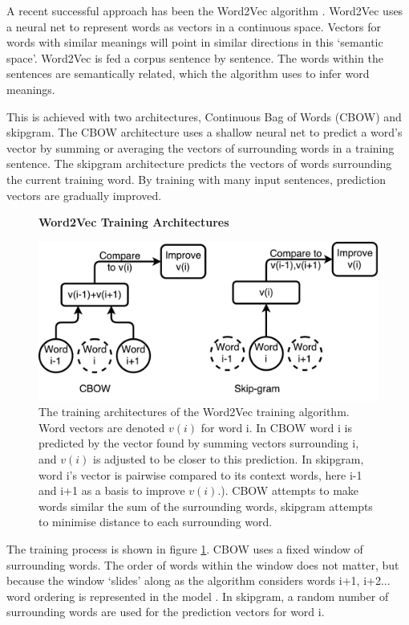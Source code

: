  A recent successful approach has been the Word2Vec algorithm \cite{word2vec1} \cite{word2vec2}.  Word2Vec uses a neural net to represent words as vectors in a continuous space. Vectors for words with similar meanings will point in similar directions in this `semantic space'. Word2Vec is fed a corpus sentence by sentence. The words within the sentences are semantically related, which the algorithm uses to infer word meanings. 
 
This is achieved with two architectures, Continuous Bag of Words (CBOW) and skipgram. The CBOW architecture uses a shallow neural net to predict a word's vector by summing or averaging the vectors of surrounding words in a training sentence. The skipgram architecture predicts the vectors of words surrounding the current training word. By training with many input sentences, prediction vectors are gradually improved. 

\begin{figure}[H]
    \centering
    \textbf{Word2Vec Training Architectures}\par\medskip
    \includegraphics[width=\textwidth]{Natural_Language_Processing/cbow_v_skip.pdf}
    \caption[Word2Vec Training Architectures ]{The training architectures of the Word2Vec training algorithm. Word vectors are denoted $v(i)$ for word i. In CBOW word i is predicted by the vector found by summing vectors surrounding i, and $v(i)$ is adjusted to be closer to this prediction. In skipgram, word i's vector is pairwise compared to its context words, here i-1 and i+1 as a basis to improve $v(i)$.). CBOW attempts to make words similar the sum of the surrounding words, skipgram attempts to minimise distance to each surrounding word.}
     \label{fig:CBOWSKIP}
\end{figure}

The training process is shown in figure \ref{fig:CBOWSKIP}. CBOW uses a fixed window of surrounding words. The order of words within the window does not matter, but because the window `slides' along as the algorithm considers words i+1, i+2... word ordering is represented in the model . In skipgram, a random number of surrounding words are used for the prediction vectors for word i. 

